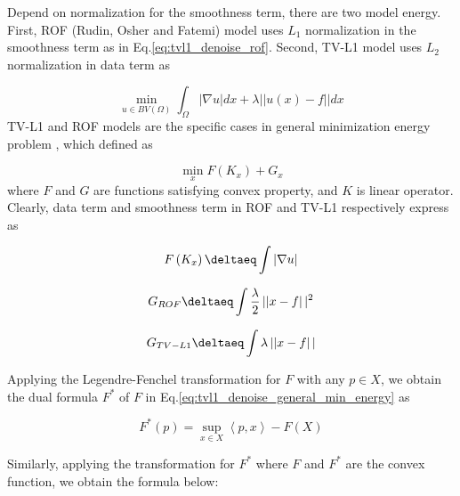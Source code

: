 Depend on normalization for the smoothness term, there are two model energy. First, ROF (Rudin, Osher and Fatemi) model uses $L_{1}$ normalization in the smoothness term as in Eq.\ref{eq:tvl1_denoise_rof}. Second, TV-L1 model uses $L_{2}$ normalization in data term as

\begin{equation}
\label{eq:tvl1_denoise_tvl1}
\min_{u \in BV\left( \Omega \right)}\int_{\Omega}\left| \nabla u \right|dx + \lambda\left||u\left( x \right) - f\right||dx
\end{equation}
TV-L1 and ROF models are the specific cases in general minimization energy problem\cite{Chambolle2010, Znah2013, Duran2013} , which defined as

\begin{equation}
    \label{eq:tvl1_denoise_general_min_energy}
    \min_{x}F\left(K_{x}\right) + G_{x}
\end{equation}
where $F$ and $G$ are functions satisfying convex property, and $K$ is linear operator. Clearly, data term and smoothness term in ROF and TV-L1 respectively express as

\begin{equation}
    \label{eq:tvl1_denoise_general_min_energy_smooth_rof}
    F\left(K_{x}\right) \deltaeq  \int\left|\nabla u\right|
\end{equation}

\begin{equation}
    \label{eq:tvl1_denoise_general_min_energy_smooth_rof}
    G_{ROF} \deltaeq  \int\frac{\lambda}{2}\left||x -f\right||^{2}
\end{equation}

\begin{equation}
    \label{eq:tvl1_denoise_general_min_energy_smooth_rof}
    G_{TV-L1} \deltaeq \int\lambda\left||x -f\right||
\end{equation}

Applying the Legendre-Fenchel transformation for $F$ with any $p \in X$, we obtain the dual formula $F^{*}$ of $F$ in Eq.\ref{eq:tvl1_denoise_general_min_energy} as

\begin{equation}
    \label{eq:tvl1_denoise_general_min_energy_dual}
    F^{*}\left(p\right) = \sup_{x \in X}\left<p, x\right> - F\left(X\right)
\end{equation}

Similarly, applying the transformation for $F^{*}$ where $F$ and $F^{*}$ are the convex function, we obtain the formula below:

